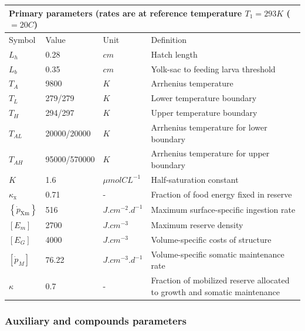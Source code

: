 \begin{table}[H]
\centering
\begin{adjustbox}{width=1.2\textwidth}
\begin{tabular}{l|l|l|l}
\hline
\multicolumn{4}{l}{
	Primary parameters (rates are at reference temperature $T_{1} = 293 K$  ($=20$\textdegree $C$)} \\
\hline
Symbol		& 
Value		& 
Unit		&
Definition	\\
\hline
$L_{h}$			& 
0.28			& 
$cm$			& 
Hatch length	\\
$L_{b}$									& 
0.35									& 
$cm$									& 
Yolk-sac to feeding larva threshold		\\
$T_{A}$					& 
9800					& 
$K$						& 
Arrhenius temperature	\\
$T_{L}$						& 
279/279						& 
$K$							& 
Lower temperature boundary	\\
$T_{H}$							& 
294/297							& 
$K$								& 
Upper temperature boundary		\\
$T_{AL}$									& 
20000/20000									& 
$K$											& 
Arrhenius temperature for lower boundary	\\
$T_{AH}$										& 
95000/570000									& 
$K$												& 
Arrhenius temperature for upper boundary		\\
$K$							& 
1.6							& 
$\mu mol CL^{-1}$			& 
Half-saturation constant	\\
$\kappa_{\mathrm{x}}$						& 
0.71										& 
-											& 
Fraction of food energy fixed in reserve	\\
$\left\{\dot{p}_\mathrm{Xm} \right\}$			& 
516												& 
$J.cm^{-2}.d^{-1}$								& 
Maximum surface-specific ingestion rate		\\
$\left[E_{m} \right]$		& 
2700						& 
$J.cm^{-3}$					& 
Maximum reserve density		\\
$\left[E_{G} \right]$				& 
4000								& 
$J.cm^{-3}$							& 
Volume-specific costs of structure	\\
$\left[\dot{p}_{M} \right]$					& 
76.22										& 
$J.cm^{-3}.d^{-1}$							& 
Volume-specific somatic maintenance rate	\\
$\kappa$																	& 
0.7																			& 
-																			& 
Fraction of mobilized reserve allocated to growth and somatic maintenance	\\
\hline
\end{tabular}
\end{adjustbox}
\end{table}

\subsubsection{Auxiliary and compounds parameters}

